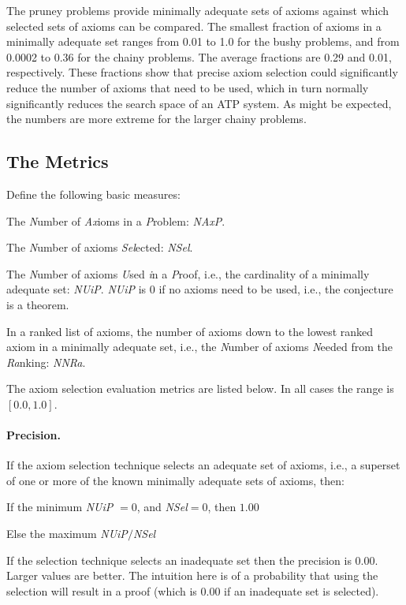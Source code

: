 \documentclass[EPiC]{easychair}
\newenvironment{packed_itemize}{
\vspace*{-0.5em}
\begin{itemize}
  \setlength{\partopsep}{0pt}
  \setlength{\itemsep}{1pt}
  \setlength{\parskip}{0pt}
  \setlength{\parsep}{0pt}
}{\end{itemize}}
\begin{document}
The pruney problems provide minimally adequate sets of axioms against which
selected sets of axioms can be compared.
The smallest fraction of axioms in a minimally adequate set ranges from 
0.01 to 1.0 for the bushy problems, and from 0.0002 to 0.36 for the chainy 
problems.
The average fractions are 0.29 and 0.01, respectively.
These fractions show that precise axiom selection could significantly reduce 
the number of axioms that need to be used, which in turn normally 
significantly reduces the search space of an ATP system.
As might be expected, the numbers are more extreme for the larger chainy 
problems.

\subsection{The Metrics}
\label{TheMetrics}

Define the following basic measures:
\begin{packed_itemize}
\item The \emph{N}umber of \emph{Ax}ioms in a \emph{P}roblem: \emph{NAxP}.
\item The \emph{N}umber of axioms \emph{Sel}ected: \emph{NSel}.
\item The \emph{N}umber of axioms \emph{U}sed \emph{i}n a \emph{P}roof, 
      i.e., the cardinality of a minimally adequate set: \emph{NUiP}.
      \emph{NUiP} is $0$ if no axioms need to be used, i.e., the conjecture 
      is a theorem.
\item In a ranked list of axioms, the number of axioms down to the lowest 
      ranked axiom in a minimally adequate set, i.e., the \emph{N}umber 
      of axioms \emph{N}eeded from the \emph{Ra}nking: \emph{NNRa}.
\end{packed_itemize}

The axiom selection evaluation metrics are listed below.
In all cases the range is $[0.0,1.0]$.

\paragraph{Precision.}
If the axiom selection technique selects an adequate set of axioms, i.e., a 
superset of one or more of the known minimally adequate sets of axioms, then:
\begin{packed_itemize}
\item If the minimum \emph{NUiP} $= 0$, and \emph{NSel}$ = 0$, then $1.00$
\item Else the maximum \emph{NUiP}$/$\emph{NSel} 
\end{packed_itemize}
If the selection technique selects an inadequate set then the precision
is $0.00$.
Larger values are better.
The intuition here is of a probability that using the selection will result
in a proof (which is $0.00$ if an inadequate set is selected).
\end{document}
